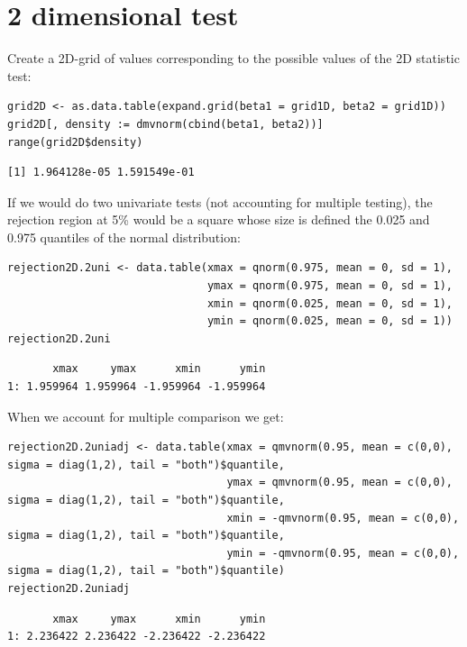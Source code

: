 \documentclass{article}
\begin{document}
\section{2 dimensional test}
\label{sec:org4988089}

Create a 2D-grid of values corresponding to the possible values of the 2D statistic test:
\lstset{language=r,label= ,caption= ,captionpos=b,numbers=none}
\begin{lstlisting}
grid2D <- as.data.table(expand.grid(beta1 = grid1D, beta2 = grid1D))
grid2D[, density := dmvnorm(cbind(beta1, beta2))]
range(grid2D$density)
\end{lstlisting}

\begin{verbatim}
[1] 1.964128e-05 1.591549e-01
\end{verbatim}

If we would do two univariate tests (not accounting for multiple
testing), the rejection region at 5\% would be a square whose size is
defined the 0.025 and 0.975 quantiles of the normal distribution:
\lstset{language=r,label= ,caption= ,captionpos=b,numbers=none}
\begin{lstlisting}
rejection2D.2uni <- data.table(xmax = qnorm(0.975, mean = 0, sd = 1),
							   ymax = qnorm(0.975, mean = 0, sd = 1),
							   xmin = qnorm(0.025, mean = 0, sd = 1),
							   ymin = qnorm(0.025, mean = 0, sd = 1))
rejection2D.2uni
\end{lstlisting}

\begin{verbatim}
       xmax     ymax      xmin      ymin
1: 1.959964 1.959964 -1.959964 -1.959964
\end{verbatim}

When we account for multiple comparison we get:
\lstset{language=r,label= ,caption= ,captionpos=b,numbers=none}
\begin{lstlisting}
rejection2D.2uniadj <- data.table(xmax = qmvnorm(0.95, mean = c(0,0), sigma = diag(1,2), tail = "both")$quantile,
								  ymax = qmvnorm(0.95, mean = c(0,0), sigma = diag(1,2), tail = "both")$quantile,
								  xmin = -qmvnorm(0.95, mean = c(0,0), sigma = diag(1,2), tail = "both")$quantile, 
								  ymin = -qmvnorm(0.95, mean = c(0,0), sigma = diag(1,2), tail = "both")$quantile)
rejection2D.2uniadj
\end{lstlisting}

\begin{verbatim}
       xmax     ymax      xmin      ymin
1: 2.236422 2.236422 -2.236422 -2.236422
\end{verbatim}
\end{document}
